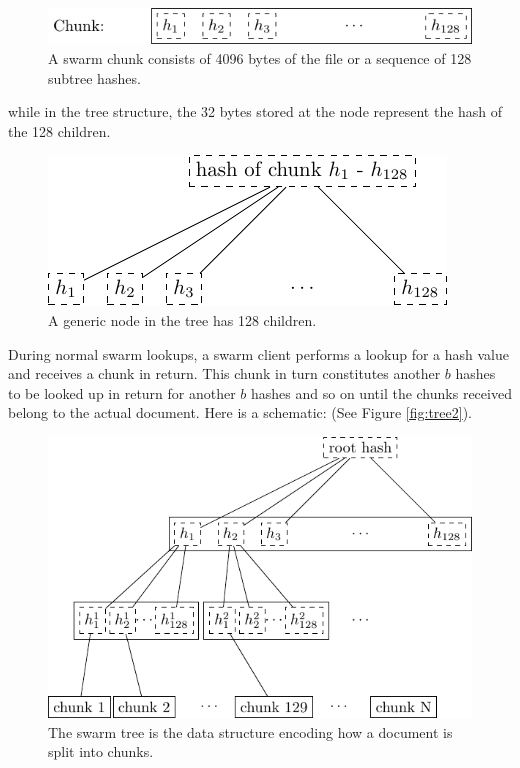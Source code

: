 \documentclass[12pt]{article}
\begin{document}
{\begin{figure}[htbp]
   \centering
   \includegraphics{fig/chunk.pdf} %
   \caption{A swarm chunk consists of 4096 bytes of the file or a sequence of 128 subtree hashes.}
   \label{fig:chunk}
\end{figure}

while in the tree structure, the 32 bytes stored at the node represent the hash of the 128 children.

\begin{figure}[htbp]
   \centering
   \includegraphics{fig/treebasic.pdf} %
   \caption{ A generic node in the tree has 128 children.}
   \label{fig:treebasic}
\end{figure}

During normal swarm lookups, a swarm client performs a lookup for a hash value and receives a chunk in return. This chunk in turn constitutes another $b$ hashes to be looked up in return for another $b$ hashes and so on until the chunks received belong to the actual document. Here is a schematic: (See Figure \ref{fig:tree2}).


\begin{figure}[htbp]
   \centering
   \includegraphics{fig/tree2.pdf} %
   \caption{ The swarm tree is the data structure encoding how a document is split into chunks.}
   \label{fig:treebasic}
\end{figure}

}
\end{document}
